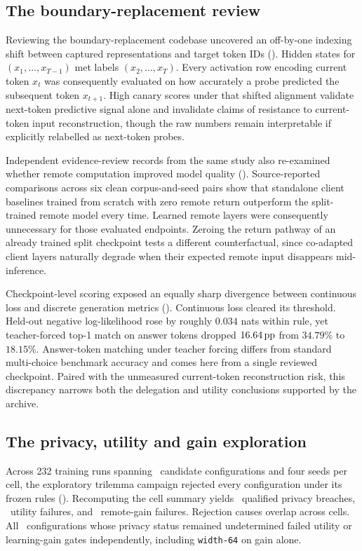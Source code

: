 \subsection{The boundary-replacement review}
\label{sec:f2}

Reviewing the boundary-replacement codebase uncovered an off-by-one
indexing shift between captured representations and target token IDs
(). Hidden states for $(x_1,\ldots,x_{T-1})$ met labels
$(x_2,\ldots,x_T)$. Every activation row encoding current token $x_t$ was
consequently evaluated on how accurately a probe predicted the subsequent
token $x_{t+1}$. High canary scores under that shifted alignment validate
next-token predictive signal alone and invalidate claims of resistance to
current-token input reconstruction, though the raw numbers remain
interpretable if explicitly relabelled as next-token probes.

Independent evidence-review records from the same study also re-examined
whether remote computation improved model quality ().
Source-reported comparisons across six clean corpus-and-seed pairs show
that standalone client baselines trained from scratch with zero remote
return outperform the split-trained remote model every time. Learned remote
layers were consequently unnecessary for those evaluated endpoints. Zeroing
the return pathway of an already trained split checkpoint tests a different
counterfactual, since co-adapted client layers naturally degrade when their
expected remote input disappears mid-inference.

Checkpoint-level scoring exposed an equally sharp divergence between
continuous loss and discrete generation metrics (). Continuous
loss cleared its threshold. Held-out negative log-likelihood rose by roughly
$0.034$ nats within rule, yet teacher-forced top-1 match on answer tokens
dropped $16.64\,\mathrm{pp}$ from $34.79\%$ to $18.15\%$. Answer-token matching under
teacher forcing differs from standard multi-choice benchmark accuracy and
comes here from a single reviewed checkpoint. Paired with the unmeasured
current-token reconstruction risk, this discrepancy narrows both the
delegation and utility conclusions supported by the archive.

\subsection{The privacy, utility and gain exploration}
\label{sec:f3}

Across 232 training runs spanning \RoneCells\ candidate configurations and
four seeds per cell, the exploratory trilemma campaign rejected every
configuration under its frozen rules (). Recomputing the cell
summary yields \RoneQualifiedBreaches\ qualified privacy breaches,
\RoneUtilityFailures\ utility failures, and \RoneGainFailures\ remote-gain
failures. Rejection causes overlap across cells. All \RoneUndetermined\
configurations whose privacy status remained undetermined failed utility or
learning-gain gates independently, including \texttt{width-64} on gain
alone.

